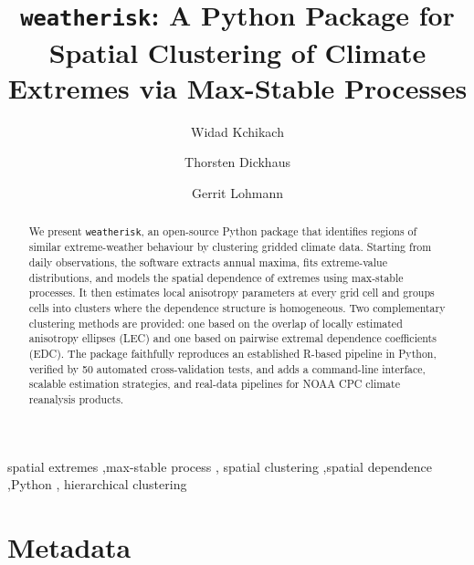\documentclass[preprint,12pt,a4paper]{elsarticle}
\begin{document}
\begin{frontmatter}

\title{\texttt{weatherisk}: A Python Package for Spatial Clustering
  of Climate Extremes via Max-Stable Processes}

\author[awi,uni]{Widad Kchikach}

\author[uni]{Thorsten Dickhaus}
\author[awi,uni]{Gerrit Lohmann}

\address[awi]{Alfred Wegener Institute Helmholtz Centre for Polar
  and Marine Research, Bremerhaven, Germany}
\address[uni]{University of Bremen, Bremen, Germany}

\begin{abstract}
We present \texttt{weatherisk}, an open-source Python package that
identifies regions of similar extreme-weather behaviour by clustering
gridded climate data.  Starting from daily observations, the software
extracts annual maxima, fits extreme-value distributions, and models
the spatial dependence of extremes using max-stable processes.  It
then estimates local anisotropy parameters at every grid cell and
groups cells into clusters where the dependence structure is
homogeneous.  Two complementary clustering methods are provided:
one based on the overlap of locally estimated anisotropy ellipses
(LEC) and one based on pairwise extremal dependence coefficients
(EDC).  The package faithfully reproduces an established R-based
pipeline in Python, verified by 50 automated cross-validation tests,
and adds a command-line interface, scalable estimation strategies,
and real-data pipelines for NOAA CPC climate reanalysis products.
\end{abstract}

\begin{keyword}
spatial extremes \sep max-stable process \sep
spatial clustering \sep spatial dependence \sep Python \sep
hierarchical clustering
\end{keyword}

\end{frontmatter}

\section*{Metadata}
\label{sec:metadata}
\end{document}
